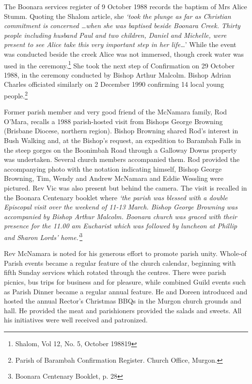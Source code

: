 The Boonara services register of 9 October 1988 records the baptism of Mrs Alice Stumm. Quoting the Shalom article, she \emph{`took the plunge as far as Christian commitment is concerned \ldots when she was baptised beside Boonara Creek. Thirty people including husband Paul and two children, Daniel and Michelle, were present to see Alice take this very important step in her life\ldots{}}' While the event was conducted beside the creek Alice was not immersed, though creek water was used in the ceremony.\footnote{Shalom, Vol 12, No. 5, October 198819} She took the next step of Confirmation on 29 October 1988, in the ceremony conducted by Bishop Arthur Malcolm. Bishop Adrian Charles officiated similarly on 2 December 1990 confirming 14 local young people.\footnote{Parish of Barambah Confirmation Register. Church Office, Murgon.}


Former parish member and very good friend of the McNamara family, Rod O'Mara, recalls a 1988 parish-hosted visit from Bishops George Browning (Brisbane Diocese, northern region). Bishop Browning shared Rod's interest in Bush Walking and, at the Bishop's request, an expedition to Barambah Falls in the steep gorges on the Boonimbah Road through a Galloway Downs property was undertaken. Several church members accompanied them. Rod provided the accompanying photo with the notation indicating himself, Bishop George Browning, Tim, Wendy and Andrew McNamara and Eddie Wessling were pictured. Rev Vic was also present but behind the camera. The visit is recalled in the Boonara Centenary booklet where \emph{`the parish was blessed with a double Episcopal visit over the weekend of 11-13 March. Bishop George Browning was accompanied by Bishop Arthur Malcolm. Boonara church was graced with their presence for the 11.00 am Eucharist which was followed by luncheon at Phillip and Sharon Lords' home.'}\footnote{Boonara Centenary Booklet, p. 28}


Rev McNamara is noted for his generous effort to promote parish unity. Whole-of Parish events became a regular feature of the church calendar, beginning with fifth Sunday services which rotated through the centres. There were parish picnics, bus trips for business and for pleasure, while combined Guild events such as Parish Dinner became a regular annual feature. He and Doreen introduced and hosted the annual Rector's Christmas BBQs in the Murgon church grounds and hall. He provided the meat and parishioners provided the salads and sweets. All his initiatives were well received and patronized.



